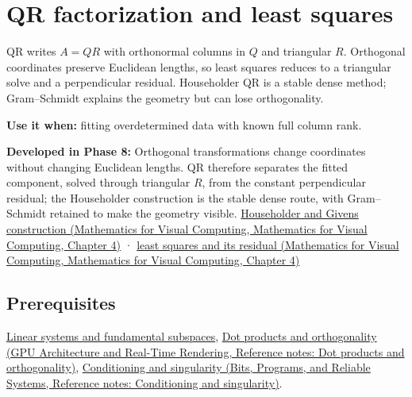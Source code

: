 \hypertarget{appendix-c3421e6b4f2c}{}\label{referencestart:appendix-c3421e6b4f2c}
\section{QR factorization and least squares}\label{appendix-c3421e6b4f2c-qr-factorization-and-least-squares}

QR writes \(A=QR\) with orthonormal columns in \(Q\) and triangular \(R\). Orthogonal coordinates preserve Euclidean lengths, so least squares reduces to a triangular solve and a perpendicular residual. Householder QR is a stable dense method; Gram--Schmidt explains the geometry but can lose orthogonality.

\textbf{Use it when:} fitting overdetermined data with known full column rank.

\textbf{Developed in Phase 8:} Orthogonal transformations change coordinates without changing Euclidean lengths. QR therefore separates the fitted component, solved through triangular \(R\), from the constant perpendicular residual; the Householder construction is the stable dense route, with Gram--Schmidt retained to make the geometry visible. \href{../02-Mathematics-for-Visual-Computing/main.pdf\#nameddest=01-foundations-i-ch020-reflections-and-plane-rotations-build-qr-without-losing-lengths}{Householder and Givens construction (Mathematics for Visual Computing, Mathematics for Visual Computing, Chapter 4)} · \href{../02-Mathematics-for-Visual-Computing/main.pdf\#nameddest=01-foundations-i-ch020-qr-turns-least-squares-into-a-triangular-solve-plus-an-irreducible-residual}{least squares and its residual (Mathematics for Visual Computing, Mathematics for Visual Computing, Chapter 4)}

\subsection{Prerequisites}\label{appendix-c3421e6b4f2c-prerequisites}

\hyperref[appendix-8572a4a060c1]{Linear systems and fundamental subspaces}, \href{../06-GPU-Architecture-and-Real-Time-Rendering/main.pdf\#nameddest=appendix-8bc4e8fc547c}{Dot products and orthogonality (GPU Architecture and Real-Time Rendering, Reference notes: Dot products and orthogonality)}, \href{../01-Bits-Programs-and-Reliable-Systems/main.pdf\#nameddest=appendix-8f6a01f284a7}{Conditioning and singularity (Bits, Programs, and Reliable Systems, Reference notes: Conditioning and singularity)}.

